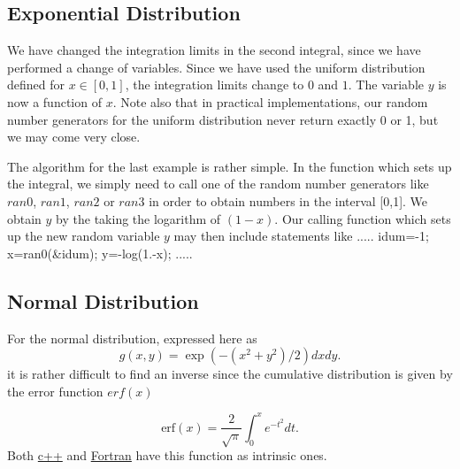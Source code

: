 \documentclass[%
oneside,                 %
final,                   %
10pt]{article}
\newenvironment{block_mdfboxadmon}[1][]{
\begin{block_mdfboxmdframed}[frametitle=#1]
}
{
\end{block_mdfboxmdframed}
}
\begin{document}
\subsection{Exponential Distribution}

\begin{block_mdfboxadmon}[]
We have changed the integration limits in the second integral, since we have performed a change of variables.  Since we have used the uniform distribution defined for $x\in [0,1]$, the integration limits change to $0$ and $1$. The variable $y$ is now a function of $x$.
Note also that in practical implementations, our random number generators for the 
uniform distribution never return exactly 0 or 1, but we may come very close.

The algorithm for the last example is rather simple. 
In the function which sets up the integral, we simply need
to call one of the random number generators 
like $ran0$, $ran1$, $ran2$ or $ran3$ in order to obtain numbers 
in the interval [0,1]. We obtain $y$ by the taking the logarithm of
$(1-x)$. Our calling function which sets up the new random
variable $y$ may then include statements like
\bcppcod
.....
idum=-1;
x=ran0(&idum);
y=-log(1.-x);
.....
\ecppcod
\end{block_mdfboxadmon} %



\subsection{Normal Distribution}

\begin{block_mdfboxadmon}[]
For the normal distribution, expressed here as
\begin{equation*}
  g(x,y)=\exp{(-(x^2+y^2)/2)}dxdy.
\end{equation*}
it is rather difficult to find an inverse since the cumulative
distribution is given by the error function $erf(x)$

\begin{equation*}
    \mathrm{erf}(x) = \frac{2}{\sqrt{\pi}}\int_{0}^x e^{-t^2} dt. 
\end{equation*}
Both \href{{http://www.cplusplus.com/reference/cmath/erfc/}}{c++}  and  \href{{https://gcc.gnu.org/onlinedocs/gfortran/ERFC.html}}{Fortran}   have this function as intrinsic ones.
\end{block_mdfboxadmon} %



\end{document}

